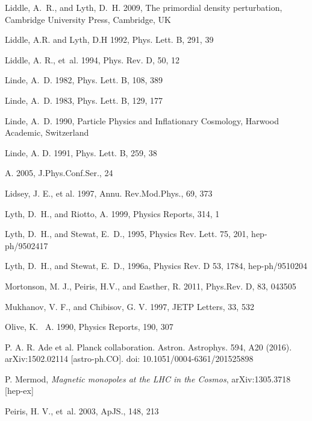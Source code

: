 \documentclass{rmaa}
\begin{document}
\begin{thebibliography}
 Liddle, A.~R., and  Lyth, D.~H. 2009, The primordial density perturbation,
  Cambridge University Press, Cambridge, UK 
  
 Liddle, A.R. and Lyth, D.H 1992, Phys. Lett. B, 291, 39

  Liddle, A. R., et~al. 1994, Phys. Rev. D, 50, 12
  
Linde, A.~D. 1982, Phys. Lett. B, 108,  389 
 
 Linde, A.~D. 1983, Phys. Lett. B, 129, 177 

 Linde, A.~D. 1990, Particle Physics and Inflationary Cosmology, Harwood Academic,
Switzerland 

 Linde, A. D. 1991, Phys. Lett. B,  259, 38
 
 A. 2005, J.Phys.Conf.Ser., 24 
 
  Lidsey, J. E., et al. 1997, Annu. Rev.Mod.Phys., 69,  373  
 
Lyth, D.~H., and {Riotto,} A. 1999, Physics Reports, 314, 1

Lyth, D.~H., and {Stewat,} E.~D., 1995, Physics Rev. Lett. 75, 201, hep-ph/9502417

Lyth, D.~H., and {Stewat,} E.~D., 1996a, Physics Rev. D 53, 1784, hep-ph/9510204

Mortonson, M. J., Peiris, H.V., and Easther, R. 2011, Phys.Rev. D, 83, 043505 
  
 Mukhanov, V. F., and {Chibisov,} G. V. 1997, JETP Letters, 33, 532
  
 Olive, K. ~A. 1990, Physics Reports, 190, 307  

P.  A.  R.  Ade  et  al.  Planck  collaboration.  Astron.  Astrophys. 594, A20 (2016). arXiv:1502.02114 [astro-ph.CO]. doi: 10.1051/0004-6361/201525898

P. Mermod, \textit{Magnetic monopoles at the LHC in the Cosmos}, arXiv:1305.3718 [hep-ex]

Peiris, H. V., et~al. 2003, ApJS., 148, 213  


\end{thebibliography}
\end{document}
